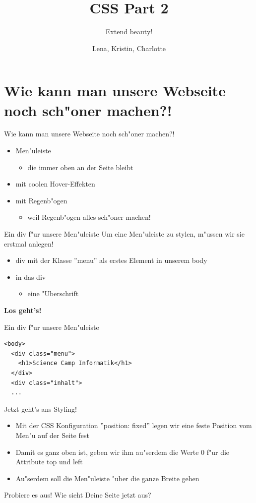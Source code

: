 \documentclass[18pt]{beamer}
\title[CSS Part 2]{CSS Part 2}
\subtitle{Extend beauty!}
\author{Lena, Kristin, Charlotte}
\begin{document}

\begin{frame}
\titlepage
\end{frame}

\section {Wie kann man unsere Webseite noch sch"oner machen?!}
\begin{frame}{Wie kann man unsere Webseite noch sch"oner machen?!}
\begin {itemize}
\item Men"uleiste
\begin{itemize}
\item die immer \glqq oben \grqq an der Seite bleibt
\end{itemize}
\pause
\item mit coolen Hover-Effekten
\pause
\item mit Regenb"ogen
\begin{itemize}
\item weil Regenb"ogen alles sch"oner machen!
\end{itemize}
\end {itemize}
\end{frame}

\begin{frame}[fragile]{Ein div f"ur unsere Men"uleiste}
Um eine Men"uleiste zu stylen, m"ussen wir sie erstmal anlegen!
\begin {itemize}
\item div mit der Klasse ''menu'' als erstes Element in unserem body
\item in das div 
\begin{itemize}
\item eine "Uberschrift
\end{itemize}
\end{itemize}
\pause
\textbf{Los geht's!}
\end{frame}

\begin{frame}[fragile]{Ein div f"ur unsere Men"uleiste}
\begin{lstlisting}
<body>
  <div class="menu">
    <h1>Science Camp Informatik</h1>
  </div>
  <div class="inhalt">
  ...
\end{lstlisting}
\end{frame}

\begin{frame}[fragile]{Jetzt geht's ans Styling!}
\begin{itemize}
\item Mit der CSS Konfiguration ''position: fixed'' legen wir eine feste Position vom Men"u auf der Seite fest
\item Damit es ganz oben ist, geben wir ihm au"serdem die Werte 0 f"ur die Attribute top und left
\item Au"serdem soll die Men"uleiste "uber die ganze Breite gehen
\end{itemize}
\pause
Probiere es aus! Wie sieht Deine Seite jetzt aus?
\end{frame}
\end{document}
